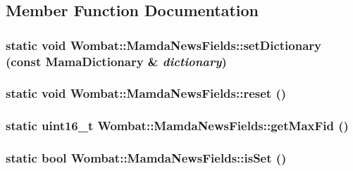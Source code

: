 \subsection{Member Function Documentation}
\hypertarget{classWombat_1_1MamdaNewsFields_20528b0b0ae1a9268dae01a4945e2ccf}{
\subsubsection[setDictionary]{\setlength{\rightskip}{0pt plus 5cm}static void Wombat::Mamda\-News\-Fields::set\-Dictionary (const Mama\-Dictionary \& {\em dictionary})}}
\label{classWombat_1_1MamdaNewsFields_20528b0b0ae1a9268dae01a4945e2ccf}


\hypertarget{classWombat_1_1MamdaNewsFields_f917e0a550a8aee5094f4fffae470ac1}{
\subsubsection[reset]{\setlength{\rightskip}{0pt plus 5cm}static void Wombat::Mamda\-News\-Fields::reset ()}}
\label{classWombat_1_1MamdaNewsFields_f917e0a550a8aee5094f4fffae470ac1}


\hypertarget{classWombat_1_1MamdaNewsFields_a48a2346c2512ccee403482724b29948}{
\subsubsection[getMaxFid]{\setlength{\rightskip}{0pt plus 5cm}static uint16\_\-t Wombat::Mamda\-News\-Fields::get\-Max\-Fid ()}}
\label{classWombat_1_1MamdaNewsFields_a48a2346c2512ccee403482724b29948}


\hypertarget{classWombat_1_1MamdaNewsFields_502cf1ab6dc451258791afa99464667f}{
\subsubsection[isSet]{\setlength{\rightskip}{0pt plus 5cm}static bool Wombat::Mamda\-News\-Fields::is\-Set ()}}
\label{classWombat_1_1MamdaNewsFields_502cf1ab6dc451258791afa99464667f}




